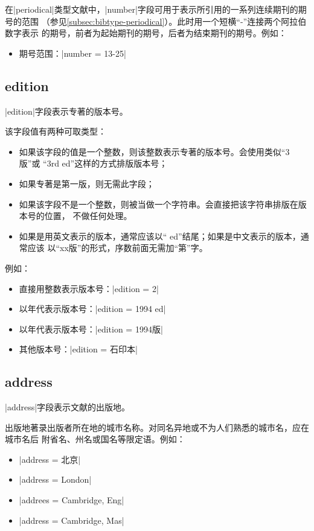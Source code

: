 在|periodical|类型文献中，|number|字段可用于表示所引用的一系列连续期刊的期号的范围
（参见\ref{subsec:bibtype-periodical}）。此时用一个短横``-''连接两个阿拉伯数字表示
的期号，前者为起始期刊的期号，后者为结束期刊的期号。例如：
\begin{itemize}
\item 期号范围：|number = {13-25}|
\end{itemize}

\subsection{edition}\label{subsec:bibfield-edition}

|edition|字段表示专著的版本号。

该字段值有两种可取类型：
\begin{itemize}
\item 如果该字段的值是一个整数，则该整数表示专著的版本号。{\BibTeX}会使用类似``3版''或
``3rd ed''这样的方式排版版本号；
\item 如果专著是第一版，则无需此字段；
\item 如果该字段不是一个整数，则被当做一个字符串。{\BibTeX}会直接把该字符串排版在版本号的位置，
不做任何处理。
\item 如果是用英文表示的版本，通常应该以`` ed''结尾；如果是中文表示的版本，通常应该
以``xx版''的形式，序数前面无需加``第''字。
\end{itemize}

例如：
\begin{itemize}
\item 直接用整数表示版本号：|edition = {2}|
\item 以年代表示版本号：|edition = {1994 ed}|
\item 以年代表示版本号：|edition = {1994版}|
\item 其他版本号：|edition = {石印本}|
\end{itemize}

\subsection{address}\label{subsec:bibfield-address}

|address|字段表示文献的出版地。

出版地著录出版者所在地的城市名称。对同名异地或不为人们熟悉的城市名，应在城市名后
附省名、州名或国名等限定语。例如：
\begin{itemize}
\item |address = {北京}|
\item |address = {London}|
\item |addrees = {Cambridge, Eng}|
\item |address = {Cambridge, Mas}|
\end{itemize}

